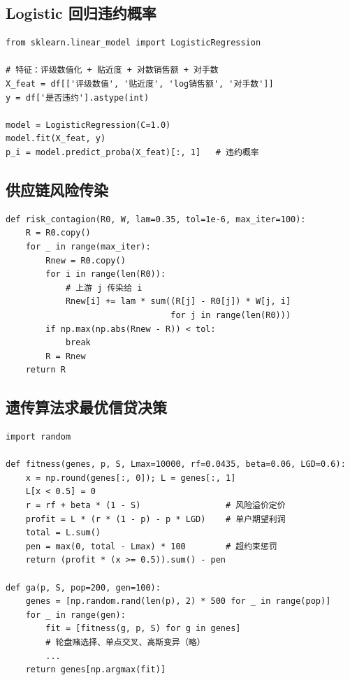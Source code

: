 \documentclass[12pt]{ctexart}
\begin{document}
\subsection{Logistic 回归违约概率}

\begin{verbatim}
from sklearn.linear_model import LogisticRegression

# 特征：评级数值化 + 贴近度 + 对数销售额 + 对手数
X_feat = df[['评级数值', '贴近度', 'log销售额', '对手数']]
y = df['是否违约'].astype(int)

model = LogisticRegression(C=1.0)
model.fit(X_feat, y)
p_i = model.predict_proba(X_feat)[:, 1]   # 违约概率
\end{verbatim}

\subsection{供应链风险传染}

\begin{verbatim}
def risk_contagion(R0, W, lam=0.35, tol=1e-6, max_iter=100):
    R = R0.copy()
    for _ in range(max_iter):
        Rnew = R0.copy()
        for i in range(len(R0)):
            # 上游 j 传染给 i
            Rnew[i] += lam * sum((R[j] - R0[j]) * W[j, i]
                                 for j in range(len(R0)))
        if np.max(np.abs(Rnew - R)) < tol:
            break
        R = Rnew
    return R
\end{verbatim}

\subsection{遗传算法求最优信贷决策}

\begin{verbatim}
import random

def fitness(genes, p, S, Lmax=10000, rf=0.0435, beta=0.06, LGD=0.6):
    x = np.round(genes[:, 0]); L = genes[:, 1]
    L[x < 0.5] = 0
    r = rf + beta * (1 - S)                 # 风险溢价定价
    profit = L * (r * (1 - p) - p * LGD)    # 单户期望利润
    total = L.sum()
    pen = max(0, total - Lmax) * 100        # 超约束惩罚
    return (profit * (x >= 0.5)).sum() - pen

def ga(p, S, pop=200, gen=100):
    genes = [np.random.rand(len(p), 2) * 500 for _ in range(pop)]
    for _ in range(gen):
        fit = [fitness(g, p, S) for g in genes]
        # 轮盘赌选择、单点交叉、高斯变异（略）
        ...
    return genes[np.argmax(fit)]
\end{verbatim}
\end{document}
